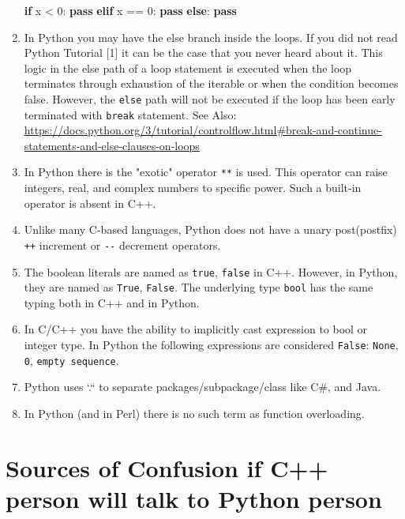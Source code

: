 \documentclass[
]{article}
\newenvironment{Shaded}{}{}
\newcommand{\ControlFlowTok}[1]{\textcolor[rgb]{0.00,0.44,0.13}{\textbf{#1}}}
\newcommand{\DecValTok}[1]{\textcolor[rgb]{0.25,0.63,0.44}{#1}}
\newcommand{\NormalTok}[1]{#1}
\newcommand{\OperatorTok}[1]{\textcolor[rgb]{0.40,0.40,0.40}{#1}}
\begin{document}
\begin{enumerate}
\begin{Shaded}
\begin{Highlighting}[]
\ControlFlowTok{if}\NormalTok{ x }\OperatorTok{\textless{}} \DecValTok{0}\NormalTok{:}
    \ControlFlowTok{pass}
\ControlFlowTok{elif}\NormalTok{ x }\OperatorTok{==} \DecValTok{0}\NormalTok{:}
    \ControlFlowTok{pass}
\ControlFlowTok{else}\NormalTok{:}
    \ControlFlowTok{pass}
\end{Highlighting}
\end{Shaded}
\item
  In Python you may have the else branch inside the loops. If you did
  not read Python Tutorial {[}1{]} it can be the case that you never
  heard about it. This logic in the else path of a loop statement is
  executed when the loop terminates through exhaustion of the iterable
  or when the condition becomes false. However, the \texttt{else} path
  will not be executed if the loop has been early terminated with
  \texttt{break} statement. See Also:
  \url{https://docs.python.org/3/tutorial/controlflow.html\#break-and-continue-statements-and-else-clauses-on-loops}
\item
  In Python there is the "exotic" operator \texttt{**} is used. This
  operator can raise integers, real, and complex numbers to specific
  power. Such a built-in operator is absent in C++.
\item
  Unlike many C-based languages, Python does not have a unary
  post(postfix) \texttt{++} increment or \texttt{-\/-} decrement
  operators.
\item
  The boolean literals are named as \texttt{true}, \texttt{false} in
  C++. However, in Python, they are named as \texttt{True},
  \texttt{False}. The underlying type \texttt{bool} has the same typing
  both in C++ and in Python.
\item
  In C/C++ you have the ability to implicitly cast expression to bool or
  integer type. In Python the following expressions are considered
  \texttt{False}: \texttt{None}, \texttt{0}, \texttt{empty\ sequence}.
\item
  Python uses `.`` to separate packages/subpackage/class like C\#, and
  Java.
\item
  In Python (and in Perl) there is no such term as function overloading.
\end{enumerate}

\hypertarget{sources-of-confusion-if-c-person-will-talk-to-python-person}{%
\section{Sources of Confusion if C++ person will talk to Python
person}\label{sources-of-confusion-if-c-person-will-talk-to-python-person}}
\end{document}
